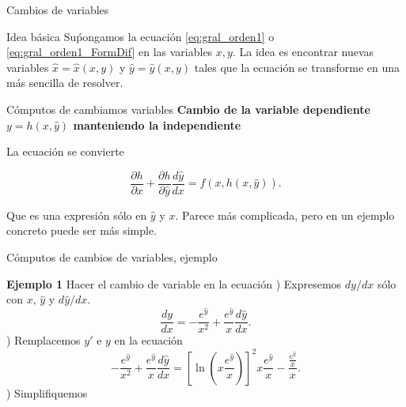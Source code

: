 \documentclass[handout,hyperref={colorlinks=true}]{beamer}
\newcommand{\nl}{\onslide<+-> }
\begin{document}
\begin{frame}{Cambios de variables}

\begin{block}{Idea básica}
 Suṕongamos la ecuación \eqref{eq:gral_orden1} o \eqref{eq:gral_orden1_FormDif} en las variables $x,y$. La idea es encontrar nuevas variables $\hat{x}=\hat{x}(x,y)$ y $\hat{y}=\hat{y}(x,y)$ tales que la ecuación se transforme en una más sencilla de resolver. 
\end{block}




\end{frame}

\begin{frame}{Cómputos de cambiamos variables}
\textbf{Cambio de la variable dependiente $y=h(x,\hat{y})$ manteniendo la independiente} 
\nl
{}

La ecuación se convierte

\[\frac{\partial h}{\partial x}+\frac{\partial h}{\partial \hat{y}}\frac{d\hat{y}}{dx}=f(x,h(x,\hat{y})).\]

Que es una expresión sólo en $\hat{y}$ y $x$. Parece más complicada, pero en un ejemplo concreto puede ser más simple.



\end{frame}

\begin{frame}{Cómputos de cambios de variables, ejemplo}

\textbf{Ejemplo 1}\nl Hacer el cambio de variable en la  ecuación 
\nl 1) Expresemos $dy/dx$ sólo con $x$, $\hat{y}$ y $d\hat{y}/dx$.
\[\frac{dy}{dx}=-\frac{e^{\hat{y}}}{x^2}+\frac{e^{\hat{y}}}{x}\frac{d\hat{y}}{dx}.\]
\nl 2) Remplacemos $y'$ e $y$ en la ecuación 
\[-\frac{e^{\hat{y}}}{x^2}+\frac{e^{\hat{y}}}{x}\frac{d\hat{y}}{dx}=\left[\ln\left(x \frac{e^{\hat{y}}}{x} \right)\right]^2x\frac{e^{\hat{y}}}{x}-\frac{\frac{e^{\hat{y}}}{x} }{x}.\]
\nl 3) Simplifiquemos




\end{frame}
\end{document}
